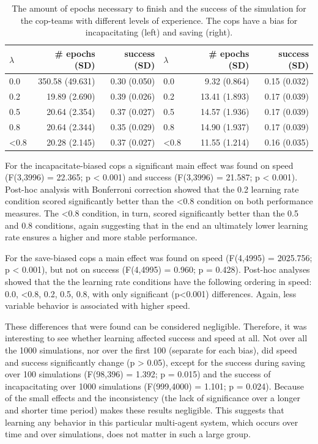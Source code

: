 \begin{table}
\begin{center}
\begin{tabular}{l r  r | l r  r}
$\lambda$ &  \# epochs (SD) & success (SD) & $\lambda$ &  \# epochs (SD) & success (SD)\\
\hline
0.0 & 350.58 (49.631) & 0.30 (0.050) & 0.0 & 9.32 (0.864) & 0.15 (0.032)\\
0.2 & 19.89 (2.690) & 0.39 (0.026) & 0.2 & 13.41 (1.893) & 0.17 (0.039)\\
0.5 & 20.64 (2.354) & 0.37 (0.027) & 0.5 & 14.57 (1.936) & 0.17 (0.039)\\
0.8 & 20.64 (2.344) & 0.35 (0.029) & 0.8 & 14.90 (1.937) & 0.17 (0.039)\\
<0.8 & 20.28 (2.145) & 0.37 (0.027) & <0.8 & 11.55 (1.214) & 0.16 (0.035)\\
\hline
\end{tabular}
\caption{The amount of epochs necessary to finish and the success of the simulation for the cop-teams with different levels of experience. The cops have a bias for incapacitating (left) and saving (right).}
\label{tab:ResultsBias}
\end{center}
\end{table}
For the incapacitate-biased cops a significant main effect was found on speed (F(3,3996) = 22.365; p < 0.001) and success (F(3,3996) = 21.587; p < 0.001). Post-hoc analysis with Bonferroni correction showed that the 0.2 learning rate condition scored significantly better than the <0.8 condition on both performance measures. The <0.8 condition, in turn, scored significantly better than the 0.5 and 0.8 conditions, again suggesting that in the end an ultimately lower learning rate ensures a higher and more stable performance. 

For the save-biased cops a main effect was found on speed (F(4,4995) = 2025.756; p < 0.001), but not on success (F(4,4995) = 0.960; p = 0.428). Post-hoc analyses showed that the the learning rate conditions have the following ordering in speed: 0.0, <0.8, 0.2, 0.5, 0.8, with only significant (p<0.001) differences. Again, less variable behavior is associated with higher speed. 

These differences that were found can be considered negligible. Therefore, it was interesting to see whether learning affected success and speed at all. Not over all the 1000 simulations, nor over the first 100 (separate for each bias), did speed and success significantly change (p > 0.05), except for the success during saving over 100 simulations (F(98,396) = 1.392; p = 0.015) and the success of incapacitating over 1000 simulations (F(999,4000) = 1.101; p = 0.024). Because of the small effects and the inconsistency (the lack of significance over a longer and shorter time period) makes these results negligible. This suggests that learning any behavior in this particular multi-agent system, which occurs over time and over simulations, does not matter in such a large group. 

